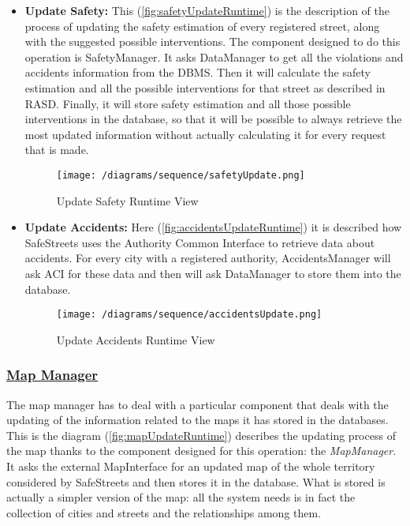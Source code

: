 			\begin{itemize}
				\item \textbf{Update Safety:} This  (\autoref{fig:safetyUpdateRuntime}) is the description of the process of updating the safety estimation of every registered street, along with the suggested possible interventions. The component designed to do this operation is SafetyManager. It asks DataManager to get all the violations and accidents information from the DBMS. Then it will calculate the safety estimation and all the possible interventions for that street as described in RASD. Finally, it will store safety estimation and all those possible interventions in the database, so that it will be possible to always retrieve the most updated information without actually calculating it for every request that is made.
				
				\begin{figure}[h!]
					\centering
					\texttt{[image: /diagrams/sequence/safetyUpdate.png]}
					\caption{\label{fig:safetyUpdateRuntime} Update Safety Runtime View}
				\end{figure}
			
				\item \textbf{Update Accidents:} Here (\autoref{fig:accidentsUpdateRuntime}) it is described how SafeStreets uses the Authority Common Interface to retrieve data about accidents. For every city with a registered authority, AccidentsManager will ask ACI for these data and then will ask DataManager to store them into the database.
				
				\begin{figure}[h!]
					\centering
					\texttt{[image: /diagrams/sequence/accidentsUpdate.png]}
					\caption{\label{fig:accidentsUpdateRuntime} Update Accidents Runtime View}
				\end{figure}
			\end{itemize}
		
			\FloatBarrier
		
		\subsubsection[Map Manager]{\hyperlink{toc}{Map Manager}}
		\label{sec:mapManagerRuntime}
		
		The map manager has to deal with a particular component that deals with the updating of the information related to the maps it has stored in the databases. This is the diagram (\autoref{fig:mapUpdateRuntime}) describes the updating process of the map thanks to the component designed for this operation: the \emph{MapManager}. It asks the external MapInterface for an updated map of the whole territory considered by SafeStreets and then stores it in the database. What is stored is actually a simpler version of the map: all the system needs is in fact the collection of cities and streets and the relationships among them.
		
